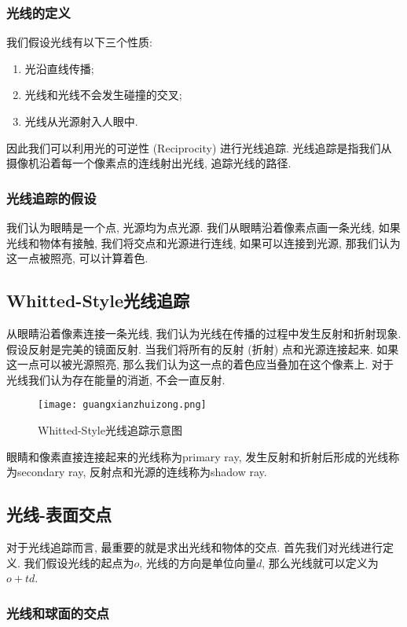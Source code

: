 \documentclass[openany]{progbookcn}
\begin{document}
\subsubsection{光线的定义}

我们假设光线有以下三个性质: 
\begin{enumerate}
	\item 光沿直线传播; 
	\item 光线和光线不会发生碰撞的交叉; 
	\item 光线从光源射入人眼中. 
\end{enumerate}
因此我们可以利用光的可逆性 (Reciprocity) 进行光线追踪. 光线追踪是指我们从摄像机沿着每一个像素点的连线射出光线, 追踪光线的路径. 

\subsubsection{光线追踪的假设}
我们认为眼睛是一个点, 光源均为点光源. 我们从眼睛沿着像素点画一条光线, 如果光线和物体有接触, 我们将交点和光源进行连线, 如果可以连接到光源, 那我们认为这一点被照亮, 可以计算着色. 

\subsection{Whitted-Style光线追踪}
从眼睛沿着像素连接一条光线, 我们认为光线在传播的过程中发生反射和折射现象. 假设反射是完美的镜面反射. 当我们将所有的反射 (折射) 点和光源连接起来. 如果这一点可以被光源照亮, 那么我们认为这一点的着色应当叠加在这个像素上. 对于光线我们认为存在能量的消逝, 不会一直反射. 

\begin{figure}[H]
	\centering
	\texttt{[image: guangxianzhuizong.png]}
	\caption{Whitted-Style光线追踪示意图}
	\label{fig:gxzz}
\end{figure}
眼睛和像素直接连接起来的光线称为primary ray, 发生反射和折射后形成的光线称为secondary ray, 反射点和光源的连线称为shadow ray. 

\subsection{光线-表面交点}
对于光线追踪而言, 最重要的就是求出光线和物体的交点. 首先我们对光线进行定义. 我们假设光线的起点为$o$, 光线的方向是单位向量$d$, 那么光线就可以定义为$o+td$. 

\subsubsection{光线和球面的交点}
\end{document}
